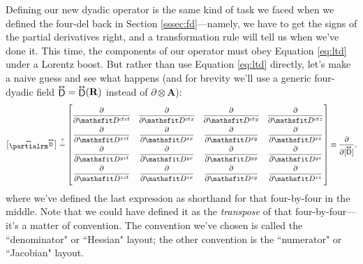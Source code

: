 \documentclass[12pt]{article}
\renewcommand{\vv}[1]{\mathbf{#1}}
\newcommand{\tightoverset}[2]{%
  \mathop{#2}\limits^{\vbox to -.5ex{\kern-0.75ex\hbox{$#1$}\vss}}}
\newcommand{\inlinedy}[1]{\tightoverset{\text{\tiny$\bm\leftrightarrow$}}{#1}}
\newcommand{\superoverset}[2]{%
  \mathop{#2}\limits^{\vbox to -.5ex{\kern-0.95ex\hbox{$#1$}\vss}}}
\newcommand{\superdy}[1]{\superoverset{\text{\tiny$\bm\leftrightarrow$}}{#1}}
\newcommand{\capdy}[1]{ \overset{ \text{\tiny$\bm\leftrightarrow$} }{\vphantom{\text{\small{A}}}\smash{#1}} }
\begin{document}
Defining our new dyadic operator is the same kind of task we faced when we defined the four-del back in Section \ref{sssec:fd}---namely, we have to get the signs of the partial derivatives right, and a transformation rule will tell us when we've done it. This time, the components of our operator must obey Equation \ref{eq:ltd} under a Lorentz boost. But rather than use Equation \ref{eq:ltd} directly, let's make a naive guess and see what happens (and for brevity we'll use a generic four-dyadic field $\inlinedy{\mathsf{D}} = \inlinedy{\mathsf{D}} (\vv R)$ instead of $\partialup \otimes \vv A$):
\begin{equation*}
\begin{bmatrix}
\capdy{\partialrm} {}^{\superdy{\mathsf{D}}} \\[-.375ex]
\end{bmatrix}
\stackrel{?}{=}
\begin{bmatrix}
\\[-2ex]
\dfrac{\partial}{\partial \mathsfit D^{ct \mkern1.5mu ct}} & \dfrac{\partial}{\partial \mathsfit D^{ct \mkern1.5mu x}} & \dfrac{\partial}{\partial \mathsfit D^{ct \mkern1.5mu y}} & \dfrac{\partial}{\partial \mathsfit D^{ct \mkern1.5mu z}} \\[2ex]
\dfrac{\partial}{\partial \mathsfit D^{x \mkern1.5mu ct}} & \dfrac{\partial}{\partial \mathsfit D^{x x}} & \dfrac{\partial}{\partial \mathsfit D^{x y}} & \dfrac{\partial}{\partial \mathsfit D^{x z}}  \\[2ex]
\dfrac{\partial}{\partial \mathsfit D^{y \mkern1.5mu ct}} & \dfrac{\partial}{\partial \mathsfit D^{y x}} & \dfrac{\partial}{\partial \mathsfit D^{y y}} & \dfrac{\partial}{\partial \mathsfit D^{y z}}  \\[2ex]
\dfrac{\partial}{\partial \mathsfit D^{z \mkern1.5mu ct}} & \dfrac{\partial}{\partial \mathsfit D^{z x}} & \dfrac{\partial}{\partial \mathsfit D^{z y}} & \dfrac{\partial}{\partial \mathsfit D^{z z}} \\[2ex]
\end{bmatrix}
\equiv
\dfrac{\partial}{\partial [ \capdy{\mathsf{D}} ]}
,
\end{equation*}
where we've defined the last expression as shorthand for that four-by-four in the middle. Note that we could have defined it as the \emph{transpose} of that four-by-four---it's a matter of convention. The convention we've chosen is called the ``denominator" or ``Hessian" layout; the other convention is the ``numerator" or ``Jacobian" layout.
\end{document}
